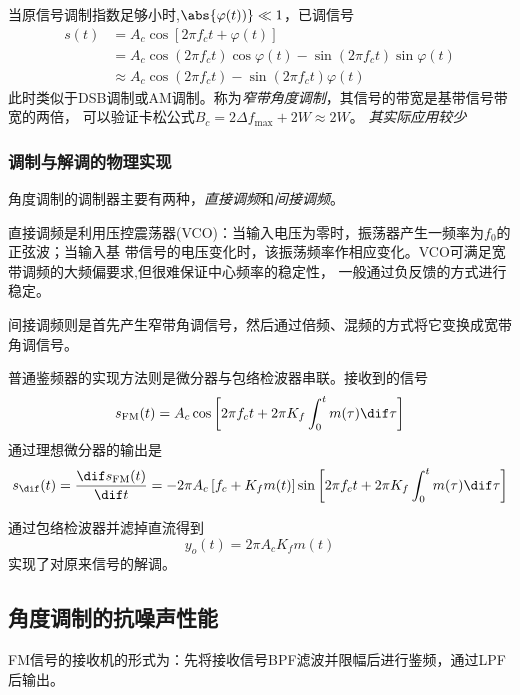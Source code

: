     当原信号调制指数足够小时,$\abs{\varphi(t))}\ll 1$，已调信号
    \begin{equation}
        \begin{split}
            s(t)&=A_c\cos[2\pi f_ct+\varphi(t)]\\
                &=A_c\cos(2\pi f_ct)\cos\varphi(t)-\sin(2\pi f_ct)\sin\varphi(t)\\
                &\approx A_c\cos(2\pi f_ct)-\sin(2\pi f_ct)\varphi(t)
        \end{split}
    \end{equation}
    此时类似于DSB调制或AM调制。称为\emph{窄带角度调制}，其信号的带宽是基带信号带宽的两倍，
    可以验证卡松公式$B_c=2\Delta f_{\text{max}}+2W\approx 2W$。
    \emph{其实际应用较少}

    \subsubsection[调制与解调的物理实现]{调制与解调的物理实现{\hspace{0pt}}\raisebox{1ex}{$\star$}}
    角度调制的调制器主要有两种，\emph{直接调频}和\emph{间接调频}。

    直接调频是利用压控震荡器(VCO)：当输入电压为零时，振荡器产生一频率为$f_0$的正弦波；当输入基
    带信号的电压变化时，该振荡频率作相应变化。VCO可满足宽带调频的大频偏要求,但很难保证中心频率的稳定性，
    一般通过负反馈的方式进行稳定。

    间接调频则是首先产生窄带角调信号，然后通过倍频、混频的方式将它变换成宽带角调信号。
    
    普通鉴频器的实现方法则是微分器与包络检波器串联。接收到的信号
    \begin{equation}
        s_{\text{FM}}(t)=A_c\cos\left[2\pi f_ct+2\pi K_f\int_{0}^{t}m(\tau)\dif \tau\right]
    \end{equation}
    通过理想微分器的输出是
    \begin{equation}
        s_{\dif}(t)=\frac{\dif s_{\text{FM}}(t)}{\dif t}=-2\pi A_c\left[f_c+K_fm(t)\right]\sin\left[2\pi f_ct+2\pi K_f\int_{0}^{t}m(\tau)\dif \tau\right]
    \end{equation}

    通过包络检波器并滤掉直流得到
    \begin{equation}
        y_o(t)=2\pi A_cK_fm(t)
    \end{equation}
    实现了对原来信号的解调。

\subsection{角度调制的抗噪声性能}
    FM信号的接收机的形式为：先将接收信号BPF滤波并限幅后进行鉴频，通过LPF后输出。
    
